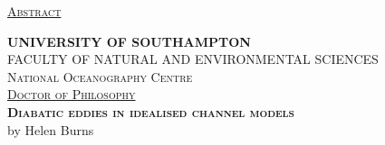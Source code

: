 \documentclass[a4paper,12pt, openright, titlepage]{book}
\begin{document}
\thispagestyle{empty}
\frontmatter
\textsc{\large \uline{Abstract}}\\[0.1cm] 

\textsc{ \textbf{\textsc{UNIVERSITY OF SOUTHAMPTON}}}\\ 
%

\textsc{\small FACULTY OF NATURAL AND ENVIRONMENTAL SCIENCES}\\[0.05cm] 
\textsc{\footnotesize National Oceanography Centre }\\[0.05cm]
\textsc{\uline{Doctor of Philosophy}}\\[0.1cm]

\textbf{\textsc{\large Diabatic eddies in idealised channel models}}\\[0.01cm]
{by Helen Burns}\\[0.2cm]
\justify

\linespread{1}
\end{document}
